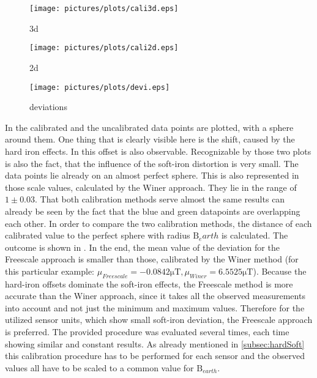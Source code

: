 \begin{figure}
\texttt{[image: pictures/plots/cali3d.eps]}\label{fig:hs3d}
\caption{3d}
\end{figure}

\begin{figure}
\centering
\texttt{[image: pictures/plots/cali2d.eps]}\label{fig:hs2d}
\caption{2d}
\end{figure}

\begin{figure}
\centering
\texttt{[image: pictures/plots/devi.eps]}\label{fig:devi}
\caption{deviations}
\end{figure}



In  the calibrated and the uncalibrated data points are plotted, with a sphere around them. One thing that is clearly visible here is the shift, caused by the hard iron effects. In  this offset is also observable. Recognizable by those two plots is also the fact, that the influence of the soft-iron distortion is very small. The data points lie already on an almost perfect sphere. This is also represented in those scale values, calculated by the Winer approach. They lie in the range of $ 1 \pm 0.03 $. That both calibration methods serve almost the same results can already be seen by the fact that the blue and green datapoints are overlapping each other. In order to compare the two calibration methods, the distance of each calibrated value to the perfect sphere with radius $ \mathrm{B}_earth $ is calculated. The outcome is shown in . In the end, the mean value of the deviation for the Freescale approach is smaller than those, calibrated by the Winer method (for this particular example: $ \mu_{Freescale} = -0.0842\si{\micro \tesla}, \mu_{Winer} = 6.5525\si{\micro \tesla} $). Because the hard-iron offsets dominate the soft-iron effects, the Freescale method is more accurate than the Winer approach, since it takes all the observed measurements into account and not just the minimum and maximum values. Therefore for the utilized sensor units, which show small soft-iron deviation, the Freescale approach is preferred. The provided procedure was evaluated several times, each time showing similar and constant results. As already mentioned in \ref{subsec:hardSoft} this calibration procedure has to be performed for each sensor and the observed values all have to be scaled to a common value for $ \mathrm{B}_{earth} $.


